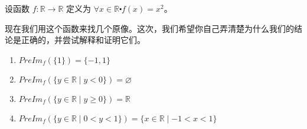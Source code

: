\begin{example}
    设函数 $f : \mathbb{R} \to \mathbb{R}$ 定义为 $\forall x \in \mathbb{R} \centerdot f(x) = x^2$。

    现在我们用这个函数来找几个原像。这次，我们希望你自己弄清楚为什么我们的结论是正确的，并尝试解释和证明它们。

    \begin{enumerate}[label=(\arabic*)]
        \item $PreIm_f (\{1\}) = \{-1, 1\}$
        \item $PreIm_f (\{y \in \mathbb{R} \mid y < 0\}) = \varnothing$
        \item $PreIm_f (\{y \in \mathbb{R} \mid y \ge 0\}) = \mathbb{R}$
        \item $PreIm_f (\{y \in \mathbb{R} \mid 0 < y < 1\}) = \{x \in \mathbb{R} \mid -1 < x < 1\}$
    \end{enumerate}
\end{example}